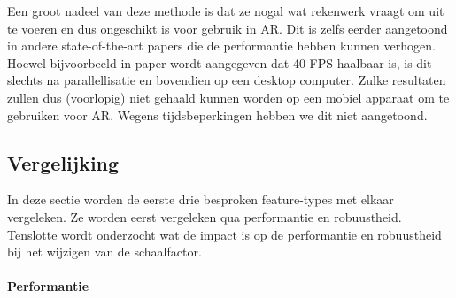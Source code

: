 Een groot nadeel van deze methode is dat ze nogal wat rekenwerk vraagt om uit te voeren en dus ongeschikt is voor gebruik in AR. Dit is zelfs eerder aangetoond in andere state-of-the-art papers die de performantie hebben kunnen verhogen. Hoewel bijvoorbeeld in paper \cite{yan2014fastest} wordt aangegeven dat 40 FPS haalbaar is, is dit slechts na parallellisatie en bovendien op een desktop computer. Zulke resultaten zullen dus (voorlopig) niet gehaald kunnen worden op een mobiel apparaat om te gebruiken voor AR. Wegens tijdsbeperkingen hebben we dit niet aangetoond.

\subsection{Vergelijking}
In deze sectie worden de eerste drie besproken feature-types met elkaar vergeleken. Ze worden eerst vergeleken qua performantie en robuustheid. Tenslotte wordt onderzocht wat de impact is op de performantie en robuustheid bij het wijzigen van de schaalfactor.


%
%
%

\paragraph{Performantie}


